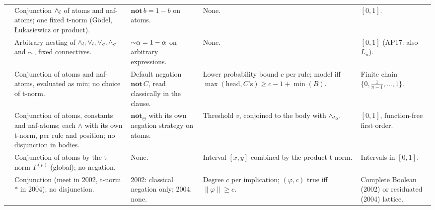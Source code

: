 {\begin{longtable}{@{}p{}p{}p{}p{}p{}@{}}
            \cite{AlvianoP13}                                & Conjunction $\land_l$ of atoms and naf-atoms; one fixed t-norm (Gödel, Łukasiewicz or product).                                                  & $\mathbf{not}\,b=1-b$ on atoms.                                                                    & None.                                                                                           & $[0,1]$.                                              \\
            \cite{AlvianoP15,AlvianoAP17}                    & Arbitrary nesting of $\land_l,\lor_l,\lor_g,\land_g$ and $\mathord{\sim} $, fixed connectives.                                                    & $\mathord{\sim} \alpha=1-\alpha$ on arbitrary expressions.                                                & None.                                                                                           & $[0,1]$ (AP17: also $L_n$).                           \\
            \cite{Lukasiewicz01}                             & Conjunction of atoms and naf-atoms, evaluated as min; no choice of t-norm.                                                                         & Default negation $\mathbf{not}\,C$, read classically in the clause.                                & Lower probability bound $c$ per rule; model iff $\max(\text{head},C\text{'s})\geq c-1+\min(B)$. & Finite chain $\{0,\frac1{n-1},\dots,1\}$.             \\
            \cite{LukasiewiczS07,LukasiewiczS09}             & Conjunction of atoms, constants and naf-atoms; each $\land$ with its own t-norm, per rule and position; no disjunction in bodies.                  & $\mathbf{not}_\ominus$ with its own negation strategy on atoms.                                    & Threshold $v$, conjoined to the body with $\land_{t_{0}}$.                                    & $[0,1]$, function-free first order.                   \\
            \cite{Mateis00}                                  & Conjunction of atoms by the t-norm $T^{(p)}$ (global); no negation.                                                                                & None.                                                                                              & Interval $[x,y]$ combined by the product t-norm.                                                & Intervals in $[0,1]$.                                 \\
            \cite{Guller02,Guller2004procedural}             & Conjunction (meet in 2002, t-norm $\ast$ in 2004); no disjunction.                                                                                 & 2002: classical negation only; 2004: none.                                                         & Degree $c$ per implication; $(\varphi,c)$ true iff $\|\varphi\|\geq c$.                         & Complete Boolean (2002) or residuated (2004) lattice. \\

\end{longtable}}
